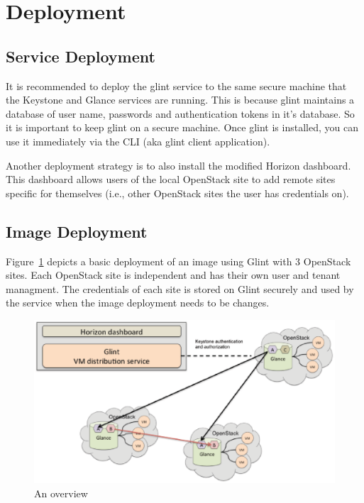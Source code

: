 \documentclass[a4paper]{jpconf}
\begin{document}
\section{Deployment}

\subsection{Service Deployment}
It is recommended to deploy the glint service to the same secure machine that the Keystone and Glance services are running. This is because glint maintains a database of user name, passwords and authentication tokens in it's database. So it is important to keep glint on a secure machine. Once glint is installed, you can use it immediately via the CLI (aka glint client application).

Another deployment strategy is to also install the modified Horizon dashboard. This dashboard allows users of the local OpenStack site to add remote sites specific for themselves (i.e., other OpenStack sites the user has credentials on).  

\subsection{Image Deployment}
Figure~\ref{fig:glintfigure} depicts a basic deployment of an image using Glint with 3 OpenStack sites. Each OpenStack site is independent and has their own user and tenant managment. The credentials of each site is stored on Glint securely and used by the service when the image deployment needs to be changes.

\begin{figure}[ht]
\begin{center}
\includegraphics[width=36pc]{GlintFigure.eps}
\caption{\label{fig:glintfigure}An overview }
\end{center}
\end{figure}
\end{document}
